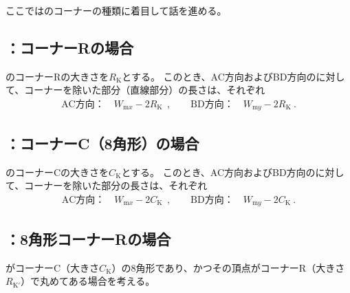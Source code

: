 \clearpage
ここでは\Keyway のコーナーの種類に着目して話を進める。


\subsection{\Keyway：コーナーRの場合}
\Keyway のコーナーRの大きさを$R_\mathrm K$とする。
このとき、AC方向およびBD方向の\KeywayWidth に対して、コーナーを除いた部分（直線部分）の長さは、それぞれ
\begin{align*}
  \text{AC方向：}\quad W_{\mathrm mx}-2R_\mathrm K~~, \qquad
  \text{BD方向：}\quad W_{\mathrm my}-2R_\mathrm K\ .
\end{align*}


\subsection{\Keyway：コーナーC（8角形）の場合}
\Keyway のコーナーCの大きさを$C_\mathrm K$とする。
このとき、AC方向およびBD方向の\KeywayWidth に対して、コーナーを除いた部分の長さは、それぞれ
\begin{align*}
  \text{AC方向：}\quad W_{\mathrm mx}-2C_\mathrm K~~, \qquad
  \text{BD方向：}\quad W_{\mathrm my}-2C_\mathrm K\ .
\end{align*}


\subsection{\Keyway：8角形コーナーRの場合}
\Keyway がコーナーC（大きさ$C_\mathrm K$）の8角形であり、かつその頂点がコーナーR（大きさ$R_\mathrm{K'}$）で丸めてある場合を考える。

